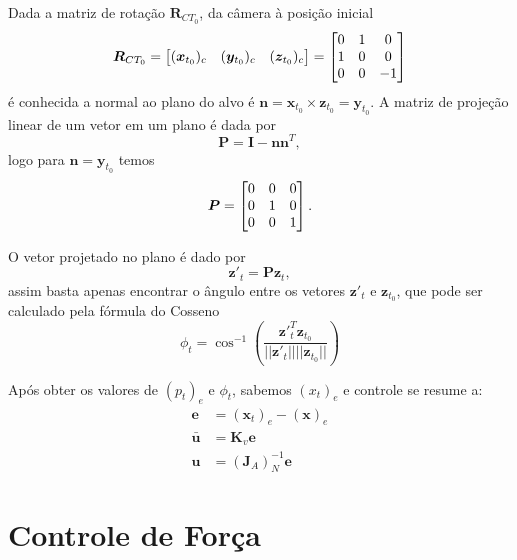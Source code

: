 Dada a matriz de rotação $\bm{R}_{CT_0}$, da câmera à posição inicial
\begin{equation}
\bm{R}_{CT_0} = \begin{bmatrix} (\bm{x}_{t_0})_c & (\bm{y}_{t_0})_c  & (\bm{z}_{t_0})_c\end{bmatrix} = 
\begin{bmatrix}
	0 & 1 & 0 \\
	1 & 0 & 0 \\
	0 & 0 & -1
\end{bmatrix}
\end{equation}
é conhecida a normal ao plano do alvo é $\bm{n} = \bm{x}_{t_0} \times \bm{z}_{t_0} =  \bm{y}_{t_0} $. A matriz de projeção linear \citep{strang} de um vetor em um plano é dada por
\begin{equation}
\bm{P} = \bm{I} - \bm{n} \bm{n}^T,
\end{equation}
logo para $\bm{n} = \bm{y}_{t_0}$ temos 
\begin{equation}
\bm{P} =  \begin{bmatrix}
	 0  &   0  &   0 \\
     0  &   1  &   0 \\
     0  &   0  &   1
\end{bmatrix}.
\end{equation}

O vetor projetado no plano é dado por
\begin{equation}
\bm{z'}_{t} = \bm{P} \bm{z}_{t},
\end{equation}
assim basta apenas encontrar o ângulo entre os vetores $\bm{z'}_{t}$ e $\bm{z}_{t_0}$, que pode ser calculado pela fórmula do Cosseno \citep{strang} 
\begin{equation}
\phi_t = \cos^{-1} \left( \frac{\bm{z'}^T_{t} \bm{z}_{t_0} } {||\bm{z'}_{t}|| ||\bm{z}_{t_0}||} \right)
\end{equation}




Após obter os valores de $(p_t)_e$ e $\phi_t$, sabemos $(x_t)_e$ e controle se resume a:
\begin{align}
\bm{e} &= (\bm{x}_t)_e - (\bm{x})_e \\
\bm{\bar{u}} &= \bm{K}_v \bm{e}  \\
\bm{u} &= (\bm{J}_{A})_N^{-1} \bm{e}
\end{align}

\section{Controle de Força}

